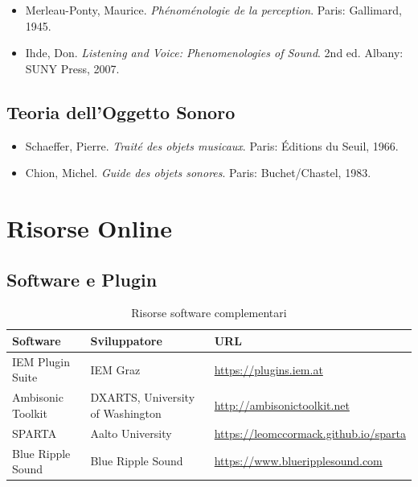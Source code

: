 \documentclass[a4paper,11pt,openany]{book}
\begin{document}
\begin{itemize}
    \item Merleau-Ponty, Maurice. \textit{Phénoménologie de la perception}. Paris: Gallimard, 1945.
    \item Ihde, Don. \textit{Listening and Voice: Phenomenologies of Sound}. 2nd ed. Albany: SUNY Press, 2007.
\end{itemize}

\subsection{Teoria dell'Oggetto Sonoro}

\begin{itemize}
    \item Schaeffer, Pierre. \textit{Traité des objets musicaux}. Paris: Éditions du Seuil, 1966.
    \item Chion, Michel. \textit{Guide des objets sonores}. Paris: Buchet/Chastel, 1983.
\end{itemize}

\section{Risorse Online}

\subsection{Software e Plugin}

\begin{table}[H]
    \centering
    \caption{Risorse software complementari}
    \label{tab:software_resources}
    \begin{tabular}{@{}p{4cm}p{4cm}p{5cm}@{}}
        \toprule
        \textbf{Software} & \textbf{Sviluppatore} & \textbf{URL} \\
        \midrule
        IEM Plugin Suite & IEM Graz & \url{https://plugins.iem.at} \\
        Ambisonic Toolkit & DXARTS, University of Washington & \url{http://ambisonictoolkit.net} \\
        SPARTA & Aalto University & \url{https://leomccormack.github.io/sparta} \\
        Blue Ripple Sound & Blue Ripple Sound & \url{https://www.blueripplesound.com} \\
        \bottomrule
    \end{tabular}
\end{table}
\end{document}
